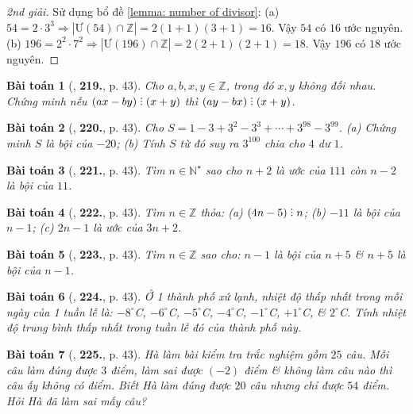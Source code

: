\documentclass{article}
\numberwithin{equation}{section}
\newtheorem{baitoan}{Bài toán}
\DeclareRobustCommand{\divby}{%
	\mathrel{\vbox{\baselineskip.65ex\lineskiplimit0pt\hbox{.}\hbox{.}\hbox{.}}}%
}
\begin{document}
\begin{proof}[2nd giải]
	Sử dụng bổ đề \ref{lemma: number of divisor}: (a) $54 = 2\cdot3^3\Rightarrow|\mbox{Ư}(54)\cap\mathbb{Z}| = 2(1 + 1)(3 + 1) = 16$. Vậy $54$ có $16$ ước nguyên. (b) $196 =2^2\cdot7^2\Rightarrow|\mbox{Ư}(196)\cap\mathbb{Z}| = 2(2 + 1)(2 + 1) = 18$. Vậy $196$ có $18$ ước nguyên.
\end{proof}

\begin{baitoan}[\cite{Tuyen_Toan_6}, \textbf{219.}, p. 43]
	Cho $a,b,x,y\in\mathbb{Z}$, trong đó $x,y$ không đối nhau. Chứng minh nếu $(ax - by)\divby(x + y)$  thì $(ay - bx)\divby(x + y)$.
\end{baitoan}

\begin{baitoan}[\cite{Tuyen_Toan_6}, \textbf{220.}, p. 43]
	Cho $S = 1 - 3 + 3^2 - 3^3 + \cdots + 3^{98} - 3^{99}$. (a) Chứng minh $S$ là bội của $-20$; (b) Tính $S$ từ đó suy ra $3^{100}$ chia cho $4$ dư $1$.
\end{baitoan}

\begin{baitoan}[\cite{Tuyen_Toan_6}, \textbf{221.}, p. 43]
	Tìm $n\in\mathbb{N}^\star$ sao cho $n + 2$ là ước của $111$ còn $n - 2$ là bội của $11$.
\end{baitoan}

\begin{baitoan}[\cite{Tuyen_Toan_6}, \textbf{222.}, p. 43]
	Tìm $n\in\mathbb{Z}$ thỏa: (a) $(4n - 5)\divby n$; (b) $-11$ là bội của $n - 1$; (c) $2n - 1$ là ước của $3n + 2$.
\end{baitoan}

\begin{baitoan}[\cite{Tuyen_Toan_6}, \textbf{223.}, p. 43]
	Tìm $n\in\mathbb{Z}$ sao cho: $n - 1$ là bội của $n + 5$ \& $n + 5$ là bội của $n - 1$.
\end{baitoan}

\begin{baitoan}[\cite{Tuyen_Toan_6}, \textbf{224.}, p. 43]
	Ở 1 thành phố xứ lạnh, nhiệt độ thấp nhất trong mỗi ngày của 1 tuần lễ là: $-8^\circ$C, $-6^\circ$C, $-5^\circ$C, $-4^\circ$C, $-1^\circ$C, $+1^\circ$C, \& $2^\circ$C. Tính nhiệt độ trung bình thấp nhất trong tuần lễ đó của thành phố này. 
\end{baitoan}

\begin{baitoan}[\cite{Tuyen_Toan_6}, \textbf{225.}, p. 43]
	Hà làm bài kiểm tra trắc nghiệm gồm $25$ câu. Mỗi câu làm đúng được $3$ điểm, làm sai được $(-2)$ điểm \& không làm câu nào thì câu ấy không có điểm. Biết Hà làm đúng được $20$ câu nhưng chỉ được $54$ điểm. Hỏi Hà đã làm sai mấy câu?
\end{baitoan}
\end{document}
